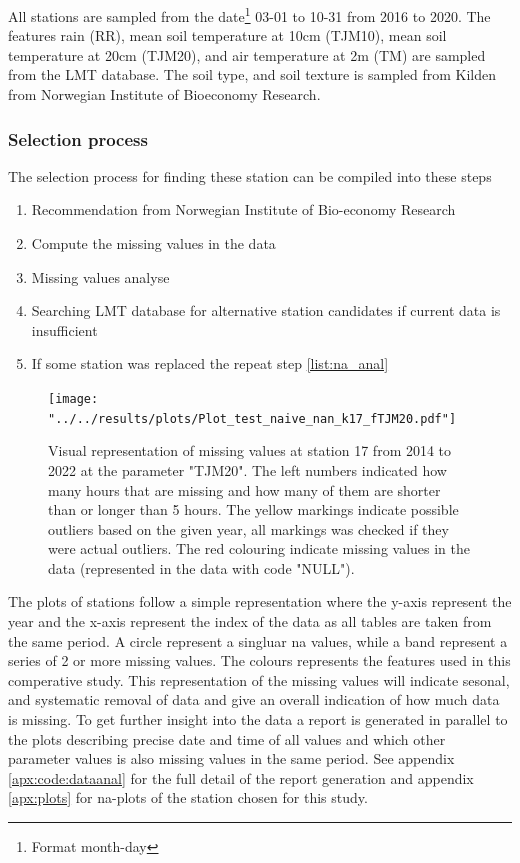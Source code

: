 All stations are sampled from the date\footnote{Format month-day} 03-01 to 10-31 from 2016 to 2020. The features rain (RR), mean soil temperature at 10cm (TJM10), mean soil temperature at 20cm (TJM20), and air temperature at 2m (TM) are sampled from the LMT database. The soil type, and soil texture is sampled from Kilden from Norwegian Institute of Bioeconomy Research.

\subsubsection{Selection process}
The selection process for finding these station can be compiled into these steps

\begin{enumerate}
	\item Recommendation from Norwegian Institute of Bio-economy Research
	\item \label{list:na_anal}Compute the missing values in the data
	\item Missing values analyse 
	\item Searching LMT database for alternative station candidates if current data is insufficient
	\item If some station was replaced the repeat step \ref{list:na_anal}
\end{enumerate}

\begin{figure}
	\centering
	\texttt{[image: "../../results/plots/Plot\_test\_naive\_nan\_k17\_fTJM20.pdf"]}
	\caption[Visual representation of station 17]{Visual representation of missing values at station 17 from 2014 to 2022 at the parameter "TJM20". The left numbers indicated how many hours that are missing and how many of them are shorter than or longer than 5 hours. The yellow markings indicate possible outliers based on the given year, all markings was checked if they were actual outliers. The red colouring indicate missing values in the data (represented in the data with code "NULL").}
	\label{fig:plot-17}
\end{figure}

The plots of stations follow a simple representation where the y-axis represent the year and the x-axis represent the index of the data as all tables are taken from the same period. A circle represent a singluar na values, while a band represent a series of 2 or more missing values. The colours represents the features used in this comperative study. This representation of the missing values will indicate sesonal, and systematic removal of data and give an overall indication of how much data is missing. To get further insight into the data a report is generated in parallel to the plots describing precise date and time of all values and which other parameter values is also missing values in the same period. See appendix \ref{apx:code:dataanal} for the full detail of the report generation and appendix \ref{apx:plots} for na-plots of the station chosen for this study.

